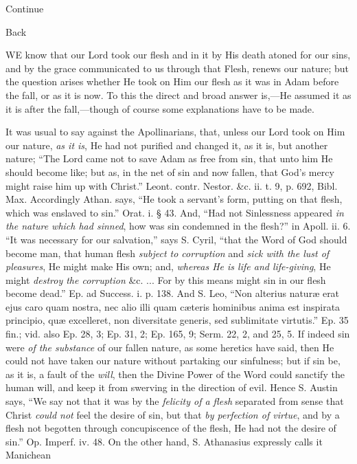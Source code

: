 Continue

Back


WE know that our Lord took our flesh and in it by His death atoned
for our sins, and by the grace communicated to us through that Flesh,
renews our nature; but the question arises whether He took on Him our
flesh as it was in Adam before the fall, or as it is now. To this the
direct and broad answer is,—He assumed it as it is after the
fall,—though of course some explanations have to be made.

It was usual to say against the Apollinarians,
that, unless our Lord took on Him our nature, \emph{as
it is}, He had not purified and changed it, as it is, but another
nature; ``The Lord came not to save Adam as free from sin, that unto
him He should become like; but as, in the net of sin and now fallen,
that God's mercy might raise him up with Christ.'' Leont. contr.
Nestor. \&c. ii. t. 9, p. 692, Bibl. Max. Accordingly Athan. says, ``He
took a servant's form, putting on that flesh, which was enslaved to
sin.'' Orat. i. § 43. And, ``Had not Sinlessness appeared \emph{in
the nature which had sinned}, how was sin condemned in the flesh?''
in Apoll. ii. 6. ``It was necessary for our salvation,'' says S. Cyril, ``that
the Word of God should become man, that human flesh \emph{subject
to corruption} and \emph{sick with
the lust of pleasures}, He might make His own; and, \emph{whereas
He is life and life-giving}, He might \emph{destroy
the corruption} \&c.
... For by this means might sin in our flesh become dead.'' Ep. ad
Success. i. p. 138. And S. Leo, ``Non alterius naturæ erat ejus caro
quam nostra, nec alio illi quam cæteris hominibus anima est inspirata
principio, quæ excelleret, non diversitate generis, sed sublimitate
virtutis.'' Ep. 35 fin.; vid. also Ep. 28, 3; Ep. 31, 2; Ep. 165, 9;
Serm. 22, 2, and 25, 5. If indeed sin were \emph{of
the substance} of our fallen nature, as some heretics have said,
then He could not have taken our nature without partaking our
sinfulness; but if sin be, as it is, a fault of the \emph{will},
then the Divine Power of the Word could sanctify the human will, and
keep it from swerving in the direction of evil. Hence S. Austin says, ``We
say not that it was by the \emph{felicity of a flesh}
separated from sense that Christ \emph{could
not} feel the desire of sin, but that \emph{by
perfection of virtue}, and by a flesh not begotten through
concupiscence of the flesh, He had not the desire of sin.'' Op. Imperf.
iv. 48. On the other hand, S. Athanasius expressly calls it Manichean
